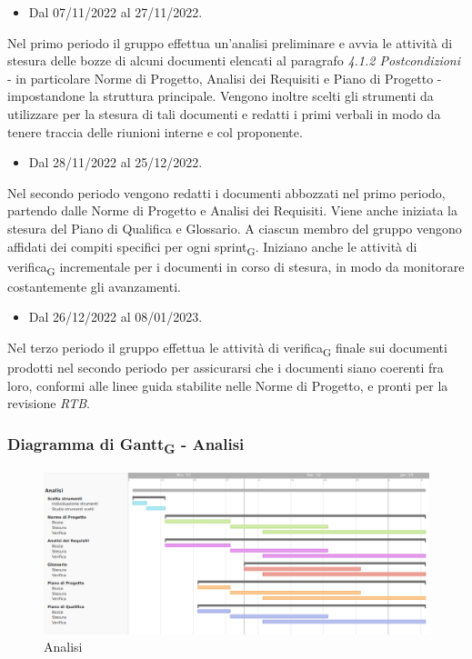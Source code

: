 \:
\begin{itemize}
    \item Dal 07/11/2022 al 27/11/2022.
\end{itemize}
Nel primo periodo il gruppo effettua un’analisi preliminare e avvia le attività di stesura delle bozze di alcuni documenti elencati al paragrafo \textit{4.1.2 Postcondizioni} - in particolare Norme di Progetto, Analisi dei Requisiti e Piano di Progetto - impostandone la struttura principale. Vengono inoltre scelti gli strumenti da utilizzare per la stesura di tali documenti e redatti i primi verbali in modo da tenere traccia delle riunioni interne e col proponente.

\:
\begin{itemize}
    \item Dal 28/11/2022 al 25/12/2022.
\end{itemize}
Nel secondo periodo vengono redatti i documenti abbozzati nel primo periodo, partendo dalle Norme di Progetto e Analisi dei Requisiti. Viene anche iniziata la stesura del Piano di Qualifica e Glossario.
A ciascun membro del gruppo vengono affidati dei compiti specifici per ogni sprint\textsubscript{G}. Iniziano anche le attività di verifica\textsubscript{G} incrementale per i documenti in corso di stesura, in modo da monitorare costantemente gli avanzamenti.

\:
\begin{itemize}
    \item Dal 26/12/2022 al 08/01/2023.
\end{itemize}
Nel terzo periodo il gruppo effettua le attività di verifica\textsubscript{G} finale sui documenti prodotti nel secondo periodo per assicurarsi che i documenti siano coerenti fra loro, conformi alle linee guida stabilite nelle Norme di Progetto, e pronti per la revisione \textit{RTB}.

\subsubsection{Diagramma di Gantt\textsubscript{G} - Analisi}

\begin{figure}[H]
\centering
\includegraphics[width=\textwidth]{img/4_analisi.png}
\caption{Analisi}
\end{figure}

